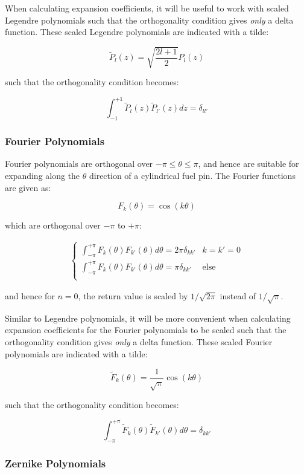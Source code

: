 \documentclass[10pt]{article}
\newcommand{\beq}{\begin{equation}}
\newcommand{\eeq}{\end{equation}}
\newcommand{\beqa}{\begin{equation}\begin{aligned}}
\newcommand{\eeqa}{\end{aligned}\end{equation}}
\numberwithin{equation}{section} %
\begin{document}
When calculating expansion coefficients, it will be useful to work with scaled Legendre polynomials such that the orthogonality condition gives {\it only} a delta function. These scaled Legendre polynomials are indicated with a tilde:

\beq
\label{eq:LegendreScaled}
\tilde{P}_l(z)=\sqrt{\frac{2l+1}{2}}P_l(z)
\eeq

such that the orthogonality condition becomes:

\beq
\label{eq:LegendreScaledOrthogonality}
\int_{-1}^{+1}\tilde{P}_l(z)\tilde{P}_{l'}(z)dz=\delta_{ll'}
\eeq

\subsubsection{Fourier Polynomials}

Fourier polynomials are orthogonal over \(-\pi\leq\theta\leq\pi\), and hence are suitable for expanding along the \(\theta\) direction of a cylindrical fuel pin. The Fourier functions are given as:

\beq
\label{eq:Fourier}
F_k(\theta)=\cos(k\theta)
\eeq

which are orthogonal over \(-\pi\) to \(+\pi\):

\beqa
\label{eq:FourierOrthogonal}
\begin{cases}
\int_{-\pi}^{+\pi}F_k(\theta)F_{k'}(\theta)d\theta=2\pi\delta_{kk'}& k=k'=0\\
\int_{-\pi}^{+\pi}F_k(\theta)F_{k'}(\theta)d\theta=\pi\delta_{kk'}& \textrm{else}\\
\end{cases}
\eeqa

and hence for \(n=0\), the return value is scaled by \(1/\sqrt{2\pi}\) instead of \(1/\sqrt{\pi}\). 

Similar to Legendre polynomials, it will be more convenient when calculating expansion coefficients for the Fourier polynomials to be scaled such that the orthogonality condition gives {\it only} a delta function. These scaled Fourier polynomials are indicated with a tilde:

\beq
\label{eq:FourierScaled}
\tilde{F}_k(\theta)=\frac{1}{\sqrt{\pi}}\cos{(k\theta)}
\eeq

such that the orthogonality condition becomes:

\beq
\int_{-\pi}^{+\pi}\tilde{F}_k(\theta)\tilde{F}_{k'}(\theta)d\theta=\delta_{kk'}
\eeq

\subsubsection{Zernike Polynomials}
\end{document}
